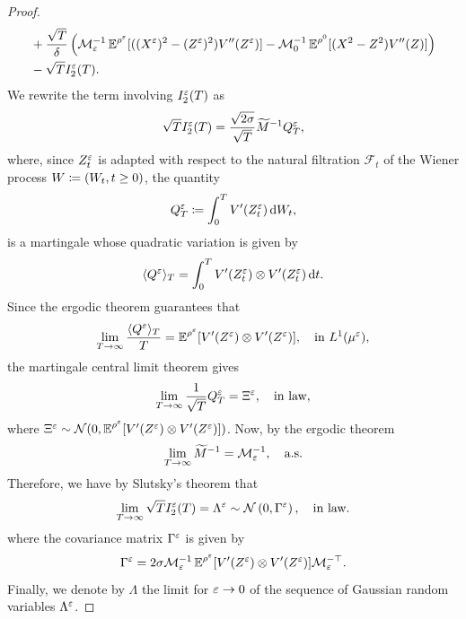 \documentclass[10pt]{article}
\begin{document}
\begin{proof}
\begin{equation}
\begin{aligned}
	&+  \frac{\sqrt{T}}\delta \left( \mathcal M_\varepsilon^{-1} \operatorname{\mathbb{E}}^{\rho^\varepsilon}[((X^\varepsilon)^2 - (Z^\varepsilon)^2)V''(Z^\varepsilon)] - \mathcal M_0^{-1} \operatorname{\mathbb{E}}^{\rho^0}[(X^2 - Z^2)V''(Z)] \right) \\
	&- \sqrt{T} I_2^\varepsilon(T).
	\end{aligned}
	\end{equation}
	 We rewrite the term involving $I_2^\varepsilon(T)$ as
	\begin{equation}
	\sqrt{T} I_2^\varepsilon(T) = \frac{\sqrt{2\sigma}}{\sqrt{T}} \widetilde M^{-1} Q^\varepsilon_T,
	\end{equation}
	where, since $Z_t^\varepsilon$ is adapted with respect to the natural filtration $\mathcal F_t$ of the Wiener process $W \coloneqq \left(W_t, t \geq 0\right)$, the quantity
	\begin{equation}
	Q^\varepsilon_T \coloneqq \int_0^T V'(Z^\varepsilon_t) \,\mathrm{d} W_t,
	\end{equation}
	is a martingale whose quadratic variation is given by
	\begin{equation}
	\langle Q^\varepsilon \rangle_T = \int_0^T V'(Z^\varepsilon_t) \otimes V'(Z^\varepsilon_t) \,\mathrm{d} t. 
	\end{equation}
	Since the ergodic theorem guarantees that 
	\begin{equation}
	\lim_{T\to\infty}\frac{\langle Q^\varepsilon \rangle_T}{T} = \operatorname{\mathbb{E}}^{\rho^\varepsilon}[V'(Z^\varepsilon) \otimes V'(Z^\varepsilon)], \quad \text{in } L^1(\mu^\varepsilon),
	\end{equation}
	the martingale central limit theorem gives 
	\begin{equation}
	\lim_{T\to\infty}\frac{1}{\sqrt{T}} Q^\varepsilon_T = \Xi^\varepsilon, \quad \text{in law},
	\end{equation}
	where $\Xi^\varepsilon \sim \mathcal N(0, \operatorname{\mathbb{E}}^{\rho^\varepsilon}[V'(Z^\varepsilon) \otimes V'(Z^\varepsilon)])$.
	Now, by the ergodic theorem 
	\begin{equation}
	\lim_{T \to \infty} \widetilde M^{-1} = \mathcal M_\varepsilon^{-1}, \quad \text{a.s.}
	\end{equation}
	Therefore, we have by Slutsky's theorem that
	\begin{equation}
	\lim_{T \to \infty} \sqrt{T} I_2^\varepsilon(T) = \Lambda^\varepsilon \sim \mathcal N\left(0, \Gamma^\varepsilon\right), \quad \text{in law}.
	\end{equation}
	where the covariance matrix $\Gamma^\varepsilon$ is given by
	\begin{equation}
		\Gamma^\varepsilon = 2\sigma \mathcal M_\varepsilon^{-1}\operatorname{\mathbb{E}}^{\rho^\varepsilon}[V'(Z^\varepsilon) \otimes V'(Z^\varepsilon)]\mathcal M_\varepsilon^{-\top}.
	\end{equation}
	Finally, we denote by $\Lambda$ the limit for $\varepsilon \to 0$ of the sequence of Gaussian random variables $\Lambda^\varepsilon$.
	

\end{proof}
\end{document}
